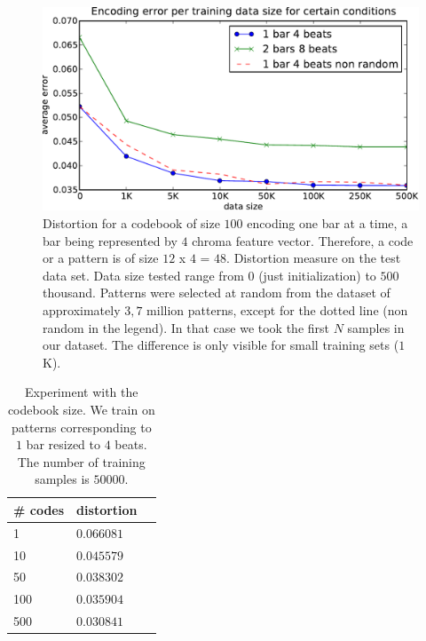 \documentclass{article}
\begin{document}
\begin{figure}[htb]
\begin{center}
\includegraphics[width=.99\columnwidth]{data_sizes}
\end{center}
\caption{\small{Distortion for a codebook of size $100$ encoding one bar
at a time, a bar being represented by $4$ chroma feature vector.
Therefore, a code or a pattern is of size $12$ x $4$ = $48$.
Distortion measure on the test data set. Data size tested range
from $0$ (just initialization) to $500$ thousand. Patterns were selected at
random from the dataset of approximately $3,7$ million patterns, except
for the dotted line (non random in the legend). In that case we took the
first $N$ samples in our dataset. The difference is only visible for small
training sets ($1$K).
}}
\label{fig:data_sizes}
\end{figure}

\begin{table}
\begin{center}
\begin{tabular}{|l|l|c|}
\hline
\# codes & distortion \\ \hline \hline
1 & $0.066081$ \\
10 & $0.045579$ \\
50 & $0.038302$ \\
100 & $0.035904$ \\
500 & $0.030841$ \\ \hline
\end{tabular}
\end{center}
\caption{\small{Experiment with the codebook size. We train on patterns
corresponding to $1$ bar resized to $4$ beats. 
The number of training samples is $50000$.
}}
\label{tab:cbsize}
\end{table}
\end{document}
